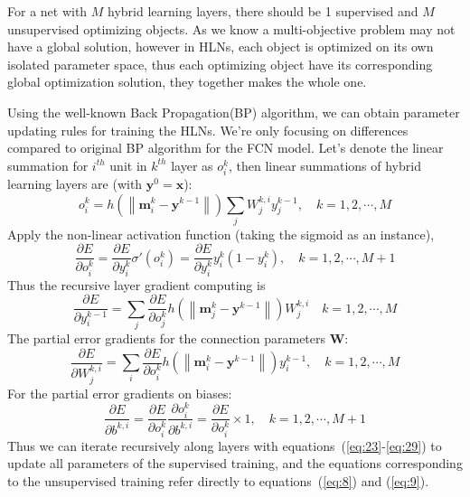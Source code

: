 \documentclass[3p,times,procedia]{elsarticle}
\begin{document}
For a net with $M$ hybrid learning layers,
there should be 1 supervised
and $M$ unsupervised optimizing objects.
As we know a multi-objective problem may not 
have a global solution, however in HLNs,
each object is optimized on its own isolated
parameter space, thus each optimizing object
have its corresponding global optimization 
solution, they together makes the whole one.

Using the well-known Back Propagation(BP)
algorithm, we can obtain parameter updating
rules for training the HLNs. 
We're only focusing on differences compared to
original BP algorithm for the FCN model.
Let's denote the linear summation for $i^{th}$ unit
in $k^{th}$ layer as $o_i^k$, then
linear summations of hybrid learning
layers are (with $\mathbf{y}^0=\mathbf{x}$):
\begin{equation}
	o_i^k =
	h\left(
	\left\|
	\mathbf{m}_i^k-\mathbf{y}^{k-1}
	\right\|
	\right)
	\sum_j 
	W_j^{k,i}
	y_j^{k-1},
	\quad k=1,2,\cdots,M
	\label{eq:23}
\end{equation}
Apply the non-linear activation function
(taking the sigmoid as an instance),
\begin{equation}
	\frac{\partial E}
	{\partial o_i^k}=
	\frac{\partial E}
	{\partial y_i^k}
	\sigma'(o_i^k)=
	\frac{\partial E}
	{\partial y_i^k}
	y_i^k\left(
	1-y_i^k
	\right),
	\quad k=1,2,\cdots,M+1
	\label{eq:24}
\end{equation}
Thus the recursive layer gradient computing
is
\begin{equation}
	\frac{\partial E}
	{\partial y_i^{k-1}}=\sum_j
	\frac{\partial E}
	{\partial o_j^k}
	h\left(
	\left\|
	\mathbf{m}_j^k-
	\mathbf{y}^{k-1}
	\right\|
	\right)
	W_j^{k,i}
	\quad k=1,2,\cdots,M
	\label{eq:25}
\end{equation}
The partial error gradients for the
connection parameters $\mathbf{W}$:
\begin{equation}
	\frac{\partial E}
	{\partial W_j^{k,i}}=\sum_i
	\frac{\partial E}
	{\partial o_i^k}
	h\left(
	\left\|
	\mathbf{m}_i^k-
	\mathbf{y}^{k-1}
	\right\|
	\right)
	y_i^{k-1},
	\quad k=1,2,\cdots,M
	\label{eq:27}
\end{equation}
For the partial error gradients on biases:
\begin{equation}
	\frac{\partial E}
	{\partial b^{k,i}}=
	\frac{\partial E}
	{\partial o_i^k}
	\frac{\partial o_i^k}
	{\partial b^{k,i}}=
	\frac{\partial E}
	{\partial o_i^k}
	\times 1,
	\quad k=1,2,\cdots,M+1
	\label{eq:29}
\end{equation}
Thus we can iterate recursively along 
layers with 
equations~(\ref{eq:23}-\ref{eq:29}) to 
update all parameters of the supervised 
training, and the equations corresponding 
to the unsupervised training refer 
directly to equations~(\ref{eq:8}) and 
(\ref{eq:9}).
\end{document}
